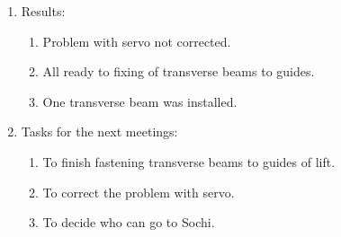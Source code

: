 \begin{enumerate}
\begin{enumerate}
    \end{enumerate}
    
	\item Results: 
	\begin{enumerate}
	  \item Problem with servo not corrected.
	  
      \item All ready to fixing of transverse beams to guides.
      
      \item One transverse beam was installed.
      
    \end{enumerate}
    
	\item Tasks for the next meetings:
	\begin{enumerate}
	  \item To finish fastening transverse beams to guides of lift.
	  
	  \item To correct the problem with servo.
	  
	  \item To decide who can go to Sochi.
	 
    \end{enumerate}     
\end{enumerate}
\fillpage

